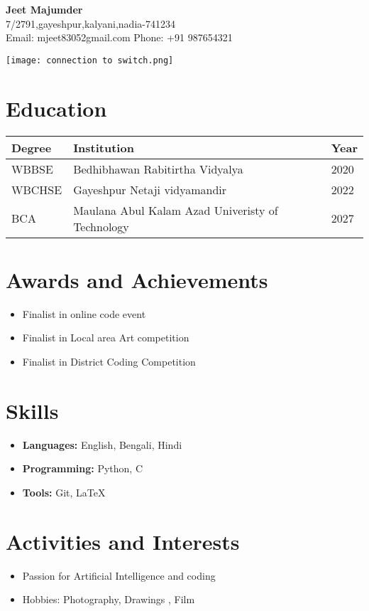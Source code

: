 \documentclass[a4paper,10pt]{article}
\begin{document}
\begin{center}
    {\LARGE \textbf{Jeet Majumder}} \\
    7/2791,gayeshpur,kalyani,nadia-741234 \\
    Email: mjeet83052gmail.com \quad Phone: +91 987654321
\end{center}

\vspace{0 pt}

\begin{flushright}
    \texttt{[image: connection to switch.png]}
\end{flushright}



\section*{Education}
\begin{tabular}{|p{}|p{}|p{}|}
\hline
\textbf{Degree} & \textbf{Institution} & \textbf{Year} \\
\hline
WBBSE & Bedhibhawan Rabitirtha Vidyalya & 2020 \\
\hline
WBCHSE & Gayeshpur Netaji vidyamandir & 2022 \\
\hline
BCA & Maulana Abul Kalam Azad Univeristy of Technology & 2027 \\
\hline
\end{tabular}

\vspace{0.5cm}

\section*{Awards and Achievements}
\begin{itemize}
    \item Finalist in online code event
    \item Finalist in Local area Art competition
    \item Finalist in District Coding Competition
\end{itemize}

\section*{Skills}
\begin{itemize}
    \item \textbf{Languages:} English, Bengali, Hindi
    \item \textbf{Programming:} Python, C
    \item \textbf{Tools:} Git, LaTeX
\end{itemize}

\section*{Activities and Interests}
\begin{itemize}
    \item Passion for Artificial Intelligence and coding
    \item Hobbies: Photography, Drawings , Film
\end{itemize}
\end{document}
